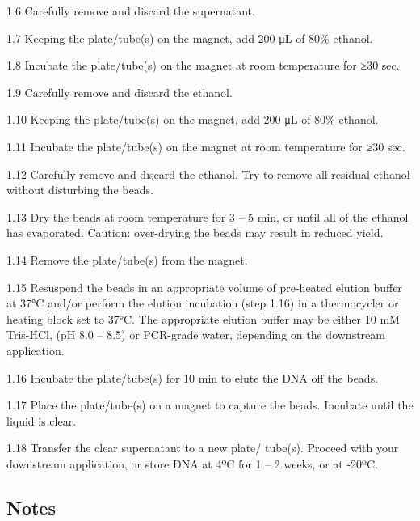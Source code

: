 \documentclass[
  letterpaper,
  DIV=11,
  numbers=noendperiod]{scrreprt}
\begin{document}
1.6 Carefully remove and discard the supernatant.

1.7 Keeping the plate/tube(s) on the magnet, add 200 μL of 80\% ethanol.

1.8 Incubate the plate/tube(s) on the magnet at room temperature for ≥30
sec.

1.9 Carefully remove and discard the ethanol.

1.10 Keeping the plate/tube(s) on the magnet, add 200 μL of 80\%
ethanol.

1.11 Incubate the plate/tube(s) on the magnet at room temperature for
≥30 sec.

1.12 Carefully remove and discard the ethanol. Try to remove all
residual ethanol without disturbing the beads.

1.13 Dry the beads at room temperature for 3 -- 5 min, or until all of
the ethanol has evaporated. Caution: over-drying the beads may result in
reduced yield.

1.14 Remove the plate/tube(s) from the magnet.

1.15 Resuspend the beads in an appropriate volume of pre-heated elution
buffer at 37°C and/or perform the elution incubation (step 1.16) in a
thermocycler or heating block set to 37°C. The appropriate elution
buffer may be either 10 mM Tris-HCl, (pH 8.0 -- 8.5) or PCR-grade water,
depending on the downstream application.

1.16 Incubate the plate/tube(s) for 10 min to elute the DNA off the
beads.

1.17 Place the plate/tube(s) on a magnet to capture the beads. Incubate
until the liquid is clear.

1.18 Transfer the clear supernatant to a new plate/ tube(s). Proceed
with your downstream application, or store DNA at 4ºC for 1 -- 2 weeks,
or at -20ºC.

\hypertarget{notes}{%
\subsection*{\texorpdfstring{\textbf{Notes}}{Notes}}\label{notes}}
\end{document}
